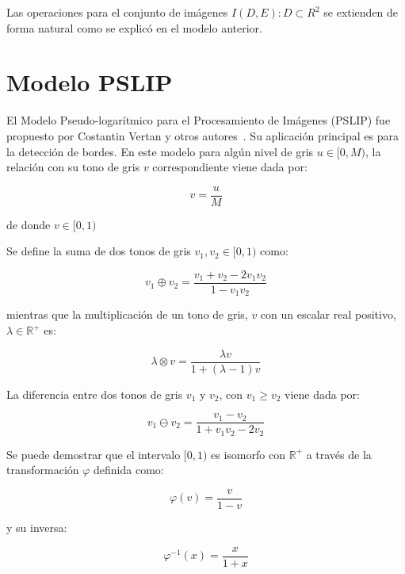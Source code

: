 Las operaciones para el conjunto de im\'agenes $I(D,E):D\subset R^2$ se extienden de forma natural como se explic\'o en el modelo anterior.

\section{Modelo PSLIP}

El Modelo Pseudo-logar\'itmico para el Procesamiento de Im\'agenes (PSLIP) fue propuesto por Costantin Vertan y otros autores~\cite{vertan2008pseudo}. Su aplicaci\'on principal es para la detecci\'on de bordes. En este modelo para alg\'un nivel de gris $u\in[0,M)$, la relaci\'on con su tono de gris $v$ correspondiente viene dada por:

\begin{equation}
	v = \frac{u}{M}
\end{equation}

de donde $v\in[0,1)$

Se define la suma de dos tonos de gris $v_1,v_2\in[0,1)$ como:

\begin{equation}
	v_1\oplus v_2=\frac{v_1 + v_2 - 2v_1v_2}{1-v_1v_2}
\end{equation}

mientras que la multiplicación de un tono de gris, $v$ con un escalar real positivo, $\lambda \in \mathbb{R}^+$ es:

\begin{equation}
	\lambda \otimes v = \frac{\lambda v}{1+(\lambda-1)v}
\end{equation}

La diferencia entre dos tonos de gris $v_1$ y $v_2$, con $v_1 \geq v_2$ viene dada por:

\begin{equation}
	v_1\ominus v_2=\frac{v_1-v_2}{1+v_1v_2-2v_2}
\end{equation}

Se puede demostrar que el intervalo $[0, 1)$ es isomorfo con $\mathbb{R}^+$ a través de la transformaci\'on $\varphi$ definida como:

\begin{equation}
	\varphi(v)=\frac{v}{1-v}
\end{equation}

y su inversa:

\begin{equation}
	\varphi^{-1}(x)=\frac{x}{1+x}
\end{equation}

